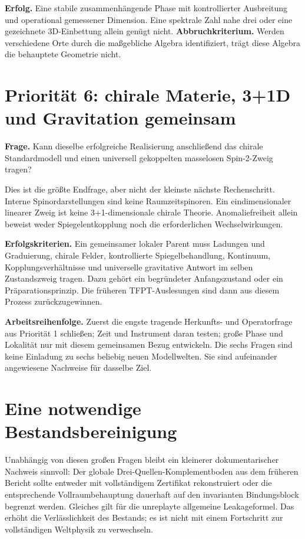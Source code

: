 \textbf{Erfolg.} Eine stabile zusammenhängende Phase mit kontrollierter Ausbreitung und operational gemessener Dimension. Eine spektrale Zahl nahe drei oder eine gezeichnete 3D-Einbettung allein genügt nicht. \textbf{Abbruchkriterium.} Werden verschiedene Orte durch die maßgebliche Algebra identifiziert, trägt diese Algebra die behauptete Geometrie nicht.

\section{Priorität 6: chirale Materie, 3+1D und Gravitation gemeinsam}
\textbf{Frage.} Kann dieselbe erfolgreiche Realisierung anschließend das chirale Standardmodell und einen universell gekoppelten masselosen Spin-2-Zweig tragen?

Dies ist die größte Endfrage, aber nicht der kleinste nächste Rechenschritt. Interne Spinordarstellungen sind keine Raumzeitspinoren. Ein eindimensionaler linearer Zweig ist keine 3+1-dimensionale chirale Theorie. Anomaliefreiheit allein beweist weder Spiegelentkopplung noch die erforderlichen Wechselwirkungen.

\textbf{Erfolgskriterien.} Ein gemeinsamer lokaler Parent muss Ladungen und Graduierung, chirale Felder, kontrollierte Spiegelbehandlung, Kontinuum, Kopplungsverhältnisse und universelle gravitative Antwort im selben Zustandszweig tragen. Dazu gehört ein begründeter Anfangszustand oder ein Präparationsprinzip. Die früheren TFPT-Auslesungen sind dann aus diesem Prozess zurückzugewinnen.

\textbf{Arbeitsreihenfolge.} Zuerst die engste tragende Herkunfts- und Operatorfrage aus Priorität 1 schließen; Zeit und Instrument daran testen; große Phase und Lokalität nur mit diesem gemeinsamen Bezug entwickeln. Die sechs Fragen sind keine Einladung zu sechs beliebig neuen Modellwelten. Sie sind aufeinander angewiesene Nachweise für dasselbe Ziel.

\section{Eine notwendige Bestandsbereinigung}
Unabhängig von diesen großen Fragen bleibt ein kleinerer dokumentarischer Nachweis sinnvoll: Der globale Drei-Quellen-Komplementboden aus dem früheren Bericht sollte entweder mit vollständigem Zertifikat rekonstruiert oder die entsprechende Vollraumbehauptung dauerhaft auf den invarianten Bindungsblock begrenzt werden. Gleiches gilt für die unreplayte allgemeine Leakageformel. Das erhöht die Verlässlichkeit des Bestands; es ist nicht mit einem Fortschritt zur vollständigen Weltphysik zu verwechseln.

